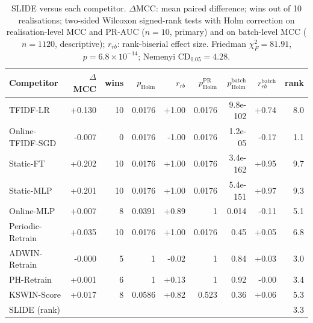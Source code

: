 \begin{table}[t]
\centering
\caption{SLIDE versus each competitor. $\Delta$MCC: mean paired difference; wins out of 10 realisations; two-sided Wilcoxon signed-rank tests with Holm correction on realisation-level MCC and PR-AUC ($n=10$, primary) and on batch-level MCC ($n=1120$, descriptive); $r_{rb}$: rank-biserial effect size. Friedman $\chi^2_F=81.91$, $p=6.8\times10^{-14}$; Nemenyi CD$_{0.05}=4.28$.}
\label{tab:stats}
\scriptsize
\setlength{\tabcolsep}{2.5pt}
\begin{tabular}{@{}lrrrrrrrr@{}}
\toprule
Competitor & $\Delta$MCC & wins & $p_{\mathrm{Holm}}$ & $r_{rb}$ & $p^{\mathrm{PR}}_{\mathrm{Holm}}$ & $p^{\mathrm{batch}}_{\mathrm{Holm}}$ & $r^{\mathrm{batch}}_{rb}$ & rank \\
\midrule
TFIDF-LR & +0.130 & 10 & 0.0176 & +1.00 & 0.0176 & 9.8e-102 & +0.74 & 8.0 \\
Online-TFIDF-SGD & -0.007 & 0 & 0.0176 & -1.00 & 0.0176 & 1.2e-05 & -0.17 & 1.1 \\
Static-FT & +0.202 & 10 & 0.0176 & +1.00 & 0.0176 & 3.4e-162 & +0.95 & 9.7 \\
Static-MLP & +0.201 & 10 & 0.0176 & +1.00 & 0.0176 & 5.4e-151 & +0.97 & 9.3 \\
Online-MLP & +0.007 & 8 & 0.0391 & +0.89 & 1 & 0.014 & -0.11 & 5.1 \\
Periodic-Retrain & +0.035 & 10 & 0.0176 & +1.00 & 0.0176 & 0.45 & +0.05 & 6.8 \\
ADWIN-Retrain & -0.000 & 5 & 1 & -0.02 & 1 & 0.84 & +0.03 & 3.0 \\
PH-Retrain & +0.001 & 6 & 1 & +0.13 & 1 & 0.92 & -0.00 & 3.4 \\
KSWIN-Score & +0.017 & 8 & 0.0586 & +0.82 & 0.523 & 0.36 & +0.06 & 5.3 \\
\midrule
SLIDE (rank) & & & & & & & & 3.3 \\
\bottomrule
\end{tabular}
\end{table}
